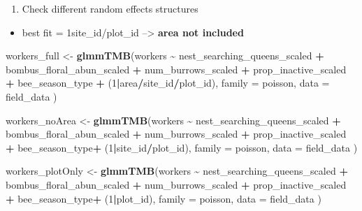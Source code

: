 \documentclass[
]{article}
\newenvironment{Shaded}{\begin{snugshade}}{\end{snugshade}}
\newcommand{\AttributeTok}[1]{\textcolor[rgb]{0.13,0.29,0.53}{#1}}
\newcommand{\DecValTok}[1]{\textcolor[rgb]{0.00,0.00,0.81}{#1}}
\newcommand{\FunctionTok}[1]{\textcolor[rgb]{0.13,0.29,0.53}{\textbf{#1}}}
\newcommand{\NormalTok}[1]{#1}
\newcommand{\OtherTok}[1]{\textcolor[rgb]{0.56,0.35,0.01}{#1}}
\newcommand{\SpecialCharTok}[1]{\textcolor[rgb]{0.81,0.36,0.00}{\textbf{#1}}}
\providecommand{\tightlist}{%
  \setlength{\itemsep}{0pt}\setlength{\parskip}{0pt}}
\begin{document}
\begin{enumerate}
\def\labelenumi{\arabic{enumi})}
\tightlist
\item
  Check different random effects structures
\end{enumerate}

\begin{itemize}
\tightlist
\item
  best fit = 1\textbar site\_id/plot\_id --\textgreater{} \textbf{area
  not included}
\end{itemize}

\begin{Shaded}
\begin{Highlighting}[]
\NormalTok{workers\_full }\OtherTok{\textless{}{-}} \FunctionTok{glmmTMB}\NormalTok{(workers }\SpecialCharTok{\textasciitilde{}}\NormalTok{ nest\_searching\_queens\_scaled }\SpecialCharTok{+}
\NormalTok{                       bombus\_floral\_abun\_scaled }\SpecialCharTok{+} 
\NormalTok{                       num\_burrows\_scaled }\SpecialCharTok{+} 
\NormalTok{                         prop\_inactive\_scaled }\SpecialCharTok{+}
\NormalTok{                       bee\_season\_type }\SpecialCharTok{+}
\NormalTok{                         (}\DecValTok{1}\SpecialCharTok{|}\NormalTok{area}\SpecialCharTok{/}\NormalTok{site\_id}\SpecialCharTok{/}\NormalTok{plot\_id), }
                     \AttributeTok{family =}\NormalTok{ poisson,}
                     \AttributeTok{data =}\NormalTok{ field\_data}
\NormalTok{                       )}


\NormalTok{workers\_noArea }\OtherTok{\textless{}{-}} \FunctionTok{glmmTMB}\NormalTok{(workers }\SpecialCharTok{\textasciitilde{}}\NormalTok{ nest\_searching\_queens\_scaled }\SpecialCharTok{+}
\NormalTok{                       bombus\_floral\_abun\_scaled }\SpecialCharTok{+} 
\NormalTok{                       num\_burrows\_scaled }\SpecialCharTok{+} 
\NormalTok{                         prop\_inactive\_scaled }\SpecialCharTok{+}
\NormalTok{                       bee\_season\_type}\SpecialCharTok{+}
\NormalTok{                         (}\DecValTok{1}\SpecialCharTok{|}\NormalTok{site\_id}\SpecialCharTok{/}\NormalTok{plot\_id), }
                     \AttributeTok{family =}\NormalTok{ poisson,}
                     \AttributeTok{data =}\NormalTok{ field\_data}
\NormalTok{                       )}

\NormalTok{workers\_plotOnly }\OtherTok{\textless{}{-}}  \FunctionTok{glmmTMB}\NormalTok{(workers }\SpecialCharTok{\textasciitilde{}}\NormalTok{ nest\_searching\_queens\_scaled }\SpecialCharTok{+}
\NormalTok{                       bombus\_floral\_abun\_scaled }\SpecialCharTok{+} 
\NormalTok{                       num\_burrows\_scaled }\SpecialCharTok{+} 
\NormalTok{                         prop\_inactive\_scaled }\SpecialCharTok{+}
\NormalTok{                       bee\_season\_type}\SpecialCharTok{+}
\NormalTok{                         (}\DecValTok{1}\SpecialCharTok{|}\NormalTok{plot\_id), }
                     \AttributeTok{family =}\NormalTok{ poisson,}
                     \AttributeTok{data =}\NormalTok{ field\_data}
\NormalTok{                       )}


\end{Highlighting}
\end{Shaded}
\end{document}
